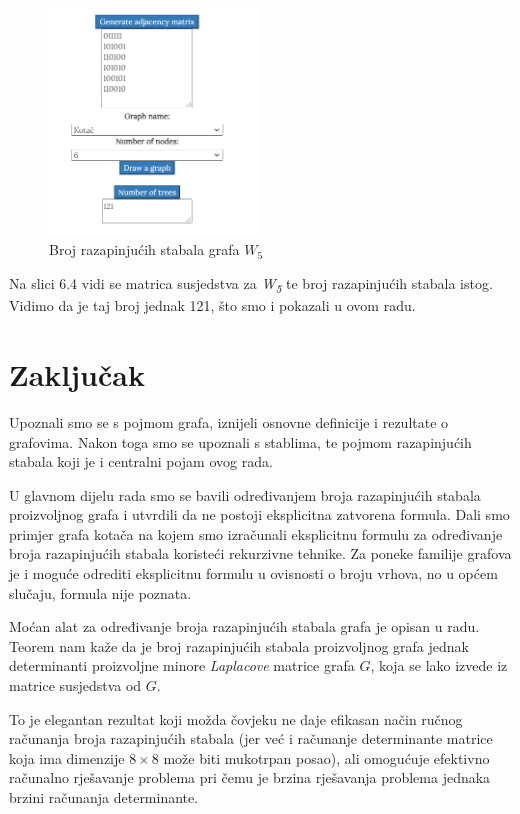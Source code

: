 \documentclass[times, utf8, zavrsni]{fer}
\begin{document}
\begin{figure}[htb]
	\centering
	\includegraphics[width=0.5\textwidth]{slike/kotacbroj.png}
	\caption{Broj razapinjućih stabala grafa $W_5$}
	\label{fig:kotac-broj}
\end{figure}

Na slici 6.4 vidi se matrica susjedstva za \textit{W\textsubscript{5}} te broj razapinjućih stabala istog. Vidimo da je taj broj jednak 121, što smo i pokazali u ovom radu.

\chapter{Zaključak}


Upoznali smo se s pojmom grafa, iznijeli osnovne definicije i rezultate o grafovima. Nakon toga smo se upoznali s stablima, te pojmom razapinjućih stabala koji je i centralni pojam ovog rada.

U glavnom dijelu rada smo se bavili određivanjem broja razapinjućih stabala proizvoljnog grafa i utvrdili da ne postoji eksplicitna zatvorena formula. Dali smo primjer grafa kotača na kojem smo izračunali eksplicitnu formulu za određivanje broja razapinjućih stabala koristeći rekurzivne tehnike. Za poneke familije grafova je i moguće odrediti eksplicitnu formulu u ovisnosti o broju vrhova, no u općem slučaju, formula nije poznata.

Moćan alat za određivanje broja razapinjućih stabala grafa je opisan u radu. Teorem nam kaže da je broj razapinjućih stabala proizvoljnog grafa jednak determinanti proizvoljne minore \textit{Laplacove} matrice grafa $G$, koja se lako izvede iz matrice susjedstva od $G$.

To je elegantan rezultat koji možda čovjeku ne daje efikasan način ručnog računanja broja razapinjućih stabala (jer već i računanje determinante matrice koja ima dimenzije $8 \times 8$ može biti mukotrpan posao), ali omogućuje efektivno računalno rješavanje problema pri čemu je brzina rješavanja problema jednaka brzini računanja determinante. 
\end{document}

